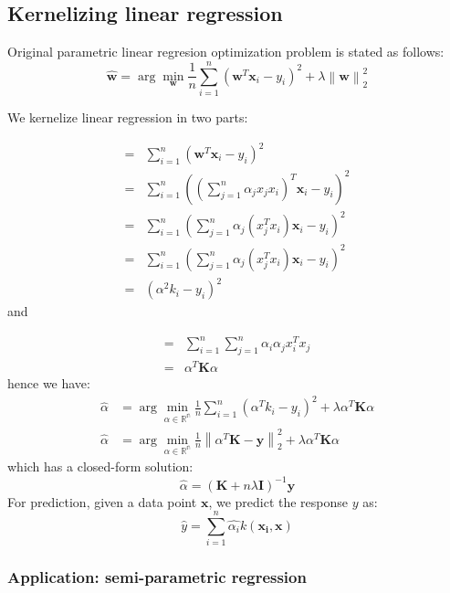 \documentclass[a4paper,10pt,twoside]{article}
\newcommand\norm[1]{\left\lVert#1\right\rVert}
\begin{document}
\subsection{Kernelizing linear regression}

Original parametric linear regresion optimization problem is stated as follows:
\begin{equation*}
    \hat{\mathbf{w}}=\arg\min_{\mathbf{w}}\frac{1}{n}\sum_{i=1}^{n}(\mathbf{w}^T\mathbf{x}_i-y_i)^2+\lambda\norm{\mathbf{w}}_2^2
\end{equation*}

We kernelize linear regression in two parts:

\begin{align*}
    =& \sum_{i=1}^{n}(\mathbf{w}^T\mathbf{x}_i-y_i)^2\\
    =& \sum_{i=1}^{n}((\sum_{j=1}^{n}\alpha_jx_jx_i)^T\mathbf{x}_i-y_i)^2\\
    =& \sum_{i=1}^{n}(\sum_{j=1}^{n}\alpha_j(x_j^Tx_i)\mathbf{x}_i-y_i)^2\\
    =& \sum_{i=1}^{n}(\sum_{j=1}^{n}\alpha_j(x_j^Tx_i)\mathbf{x}_i-y_i)^2\\
    =& (\alpha^2k_i-y_i)^2
\end{align*}
and 

\begin{align*}
    =& \sum_{i=1}^{n}\sum_{j=1}^{n}\alpha_i\alpha_jx_i^Tx_j\\
    =& \alpha^T\mathbf{K}\alpha
\end{align*}
hence we have:
\begin{align*}
    \hat{\alpha}&=\arg\min_{\alpha\in\mathbb{R^n}}\frac{1}{n}\sum_{i=1}^{n}(\alpha^Tk_i-y_i)^2+\lambda\alpha^T\mathbf{K}\alpha\\
    \hat{\alpha}&=\arg\min_{\alpha\in\mathbb{R^n}}\frac{1}{n}\norm{\alpha^T\mathbf{K}-\mathbf{y}}_2^2+\lambda\alpha^T\mathbf{K}\alpha
\end{align*}
which has a closed-form solution:
\begin{equation*}
    \hat{\alpha}=(\mathbf{K}+n\lambda \mathbf{I})^{-1}\mathbf{y}
\end{equation*} 
For prediction, given a data point $\mathbf{x}$, we predict the response $y$ as:
\begin{equation*}
    \hat{y}=\sum_{i=1}^{n}\hat{\alpha_i}k(\mathbf{x_i},\mathbf{x})
\end{equation*}

\subsubsection{Application: semi-parametric regression}
\end{document}
